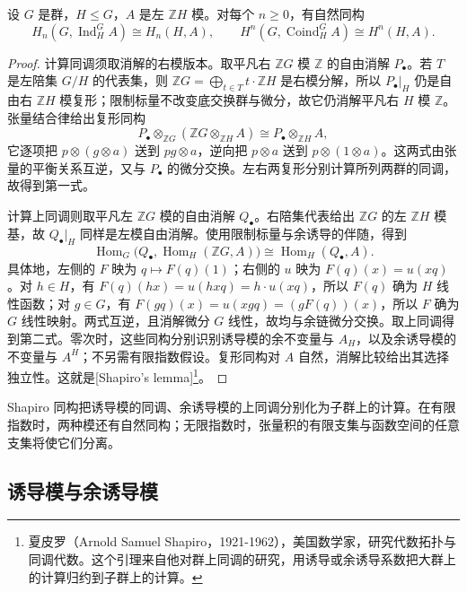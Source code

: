 \begin{theorem}[Shapiro 引理]\label{b4:thm:shapiro}
	设 \(G\) 是群，\(H\le G\)，\(A\) 是左 \(\mathbb ZH\) 模。对每个 \(n\ge0\)，有自然同构
	\[
		H_n(G,\operatorname{Ind}_H^G A)\cong H_n(H,A),\qquad H^n(G,\operatorname{Coind}_H^G A)\cong H^n(H,A).
	\]
\end{theorem}
\begin{proof}
	计算同调须取消解的右模版本。取平凡右 \(\mathbb ZG\) 模 \(\mathbb Z\) 的自由消解 \(P_\bullet\)。若 \(T\) 是左陪集 \(G/H\) 的代表集，则 \(\mathbb ZG=\bigoplus_{t\in T}t\cdot\mathbb ZH\) 是右模分解，所以 \(P_\bullet|_H\) 仍是自由右 \(\mathbb ZH\) 模复形；限制标量不改变底交换群与微分，故它仍消解平凡右 \(H\) 模 \(\mathbb Z\)。张量结合律给出复形同构
	\[
		P_\bullet\otimes_{\mathbb ZG} (\mathbb ZG\otimes_{\mathbb ZH}A) \cong P_\bullet\otimes_{\mathbb ZH}A,
	\]
	它逐项把 \(p\otimes(g\otimes a)\) 送到 \(pg\otimes a\)，逆向把 \(p\otimes a\) 送到 \(p\otimes(1\otimes a)\)。这两式由张量的平衡关系互逆，又与 \(P_\bullet\) 的微分交换。左右两复形分别计算所列两群的同调，故得到第一式。

	计算上同调则取平凡左 \(\mathbb ZG\) 模的自由消解 \(Q_\bullet\)。右陪集代表给出 \(\mathbb ZG\) 的左 \(\mathbb ZH\) 模基，故 \(Q_\bullet|_H\) 同样是左模自由消解。使用限制标量与余诱导的伴随，得到
	\[
		\operatorname{Hom}_G \bigl(Q_\bullet,\operatorname{Hom}_H(\mathbb ZG,A)\bigr) \cong\operatorname{Hom}_H(Q_\bullet,A).
	\]
	具体地，左侧的 \(F\) 映为 \(q\mapsto F(q)(1)\)；右侧的 \(u\) 映为 \(F(q)(x)=u(xq)\)。对 \(h\in H\)，有 \(F(q)(hx)=u(hxq)=h\cdot u(xq)\)，所以 \(F(q)\) 确为 \(H\) 线性函数；对 \(g\in G\)，有 \(F(gq)(x)=u(xgq)=(gF(q))(x)\)，所以 \(F\) 确为 \(G\) 线性映射。两式互逆，且消解微分 \(G\) 线性，故均与余链微分交换。取上同调得到第二式。零次时，这些同构分别识别诱导模的余不变量与 \(A_H\)，以及余诱导模的不变量与 \(A^H\)；不另需有限指数假设。复形同构对 \(A\) 自然，消解比较给出其选择独立性。这就是[Shapiro's lemma]\footnote{夏皮罗（Arnold Samuel Shapiro，1921-1962），美国数学家，研究代数拓扑与同调代数。这个引理来自他对群上同调的研究，用诱导或余诱导系数把大群上的计算归约到子群上的计算。}。
\end{proof}

Shapiro 同构把诱导模的同调、余诱导模的上同调分别化为子群上的计算。在有限指数时，两种模还有自然同构；无限指数时，张量积的有限支集与函数空间的任意支集将使它们分离。

\subsection{诱导模与余诱导模}
\label{b4:subsec:1103:03}

